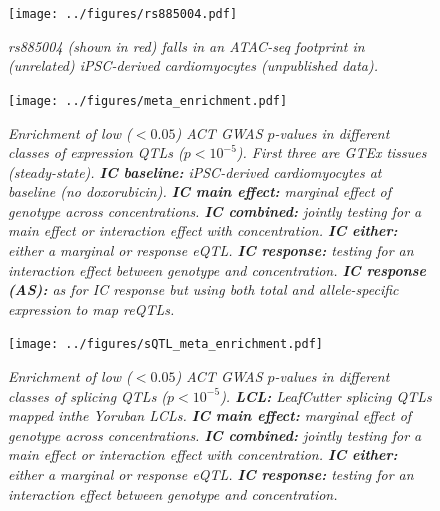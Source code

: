 \documentclass{article}
\begin{document}
\begin{figure}[h]
\begin{center}
    \texttt{[image: ../figures/rs885004.pdf]} %
    \caption{\it{rs885004 (shown in red) falls in an ATAC-seq footprint in (unrelated) iPSC-derived cardiomyocytes (unpublished data).}}
    \label{fig:rs885004}
    \end{center}
\end{figure}

\begin{figure}[h]
\begin{center}
    \texttt{[image: ../figures/meta\_enrichment.pdf]} 
    \caption{\it{Enrichment of low ($<0.05$) ACT GWAS $p$-values in different classes of expression QTLs ($p < 10^{-5}$). First three are GTEx tissues (steady-state). \textbf{IC baseline:} iPSC-derived cardiomyocytes at baseline (no doxorubicin). \textbf{IC main effect:} marginal effect of genotype across concentrations. \textbf{IC combined:} jointly testing for a main effect or interaction effect with concentration. \textbf{IC either:} either a marginal or response eQTL. \textbf{IC response:} testing for an interaction effect between genotype and concentration. \textbf{IC response (AS):} as for IC response but using both total and allele-specific expression to map reQTLs.}}
    \label{fig:meta_enrichment}
    \end{center}
\end{figure}

\begin{figure}[h]
\begin{center}
    \texttt{[image: ../figures/sQTL\_meta\_enrichment.pdf]} 
    \caption{\it{Enrichment of low ($<0.05$) ACT GWAS $p$-values in different classes of splicing QTLs ($p < 10^{-5}$). \textbf{LCL:} LeafCutter splicing QTLs mapped inthe Yoruban LCLs\cite{li2016rna}. \textbf{IC main effect:} marginal effect of genotype across concentrations. \textbf{IC combined:} jointly testing for a main effect or interaction effect with concentration. \textbf{IC either:} either a marginal or response eQTL. \textbf{IC response:} testing for an interaction effect between genotype and concentration.}}
    \label{fig:sQTL_meta_enrichment}
    \end{center}
\end{figure}
\end{document}
